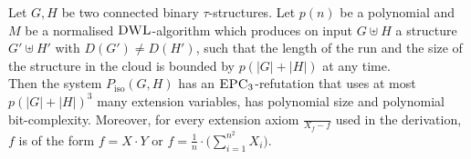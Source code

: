 \documentclass[a4paper,UKenglish,cleveref, autoref, thm-restate]{lipics-v2021}
\newcommand{\EPC}{\mbox{\sc EPC}}
\newcommand{\DWL}{\mbox{\sc DWL}}
\newcommand{\Piso}{P_{\text{iso}}}
\begin{document}
	\begin{lemma}
		\label{lem:PC_transferToProofComplexity}
		Let $G, H$ be two connected binary $\tau$-structures. Let $p(n)$ be a polynomial and $M$ be a normalised $\DWL$-algorithm which produces on input $G \uplus H$ a structure $G' \uplus H'$ with $D(G') \neq D(H')$, such that the length of the run and the size of the structure in the cloud is bounded by $p(|G| + |H|)$ at any time.\\
		Then the system $\Piso(G,H)$ has an $\EPC_3$-refutation that uses at most $p(|G| + |H|)^3$ many extension variables, has polynomial size and polynomial bit-complexity. Moreover, for every extension axiom $\frac{}{X_f -f}$ used in the derivation, $f$ is of the form $f = X \cdot Y$ or $f = \frac{1}{n} \cdot \Big(\sum_{i=1}^{n^2} X_i\Big)$.
	\end{lemma}	
\end{document}
